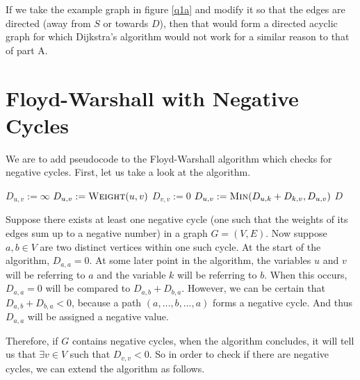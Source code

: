 \documentclass{article}
\begin{document}
If we take the example graph in figure \ref{q1a} and modify it so that the edges are directed (away from \(S\) or towards \(D\)), then that would form a directed acyclic graph for which Dijkstra's algorithm would not work for a similar reason to that of part A.

\section{Floyd-Warshall with Negative Cycles}

We are to add pseudocode to the Floyd-Warshall algorithm which checks for negative cycles. First, let us take a look at the algorithm.

\begin{algorithm}
	\begin{algorithmic}
		 
		\State \(D_{u,v} := \infty\)
		\EndFor
		 
		\State \(D_{u,v} := \Call{Weight}{u, v}\)
		\EndFor
		 
		\State \(D_{v,v} := 0\)
		\EndFor
		 
		\State \(D_{u,v} := \Call{Min}{D_{u,k} + D_{k,v}, D_{u,v}}\) 
		\EndFor
		\EndFor
		\EndFor
		\State \Return \(D\)
		\EndFunction
	\end{algorithmic}
\end{algorithm}

Suppose there exists at least one negative cycle (one such that the weights of its edges sum up to a negative number) in a graph \(G = (V, E)\). Now suppose \(a, b \in V\) are two distinct vertices within one such cycle. At the start of the algorithm, \(D_{a,a} = 0\). At some later point in the algorithm, the variables \(u\) and \(v\) will be referring to \(a\) and the variable \(k\) will be referring to \(b\). When this occurs, \(D_{a,a} = 0\) will be compared to \(D_{a,b} + D_{b,a}\). However, we can be certain that \(D_{a,b} + D_{b,a} < 0\), because a path \((a, \dots, b, \dots, a)\) forms a negative cycle. And thus \(D_{a,a}\) will be assigned a negative value.

Therefore, if \(G\) contains negative cycles, when the algorithm concludes, it will tell us that \(\exists v \in V\) such that \(D_{v,v} < 0\). So in order to check if there are negative cycles, we can extend the algorithm as follows.
\end{document}
